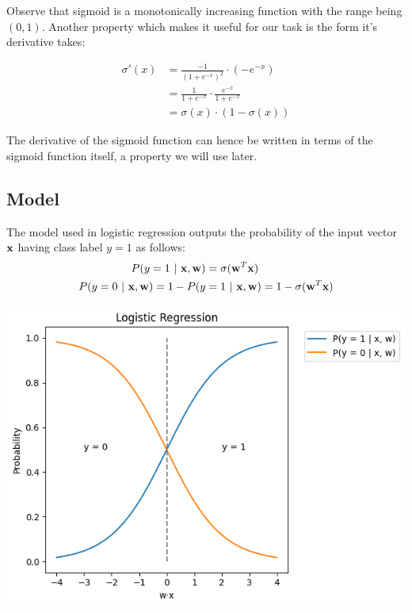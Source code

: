Observe that sigmoid is a monotonically increasing function with the range being $(0, 1)$. Another property which makes it useful for our task is the form it's derivative takes:

\begin{align*}
  \sigma'(x) & = \frac{-1}{(1 + e^{-x})^2} \cdot (-e^{-x})            \\
             & = \frac{1}{1 + e^{-x}} \cdot \frac{e^{-x}}{1 + e^{-x}} \\
             & = \sigma(x)\cdot(1 - \sigma(x))
\end{align*}

The derivative of the sigmoid function can hence be written in terms of the sigmoid function itself, a property we will use later.

\subsection{Model}

The model used in logistic regression outputs the probability of the input vector $\textbf{x}$ having class label $y = 1$ as follows:
\begin{align*}
  P(y = 1 \ | \  \textbf{x}, \textbf{w})           & = \sigma(\textbf{w}^T \textbf{x})                              \\
  P(y = 0 \ | \  \textbf{x}, \textbf{w}) = 1 - P(y & = 1 \ | \  \textbf{x}, \textbf{w}) = 1 - \sigma(\textbf{w}^T\textbf{x})
\end{align*}

\begin{center}
  \includegraphics[scale=0.35]{images/05_01.png}
\end{center}

